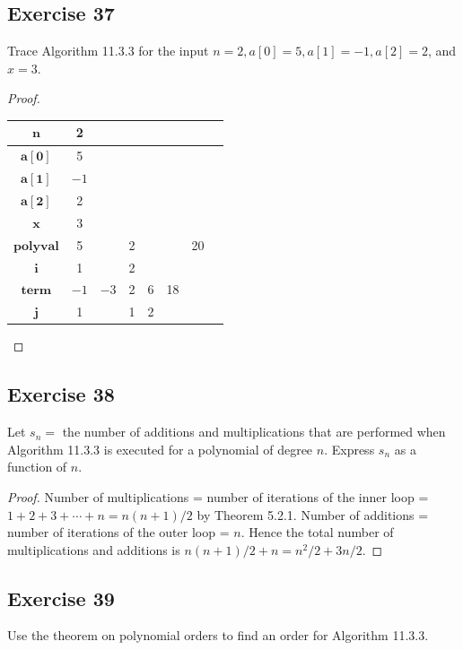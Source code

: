 \documentclass[14pt]{extarticle}
\begin{document}
\subsection{Exercise 37}
Trace Algorithm 11.3.3 for the input \(n = 2, a[0] = 5, a[1] = -1, a[2] = 2\), and \(x = 3\).

\begin{proof}
\begin{center}
\begin{tabular}{|c|c|c|c|c|c|c|c|}
\hline
\(\bm{n}\)       &2&    & & &  &  \\
\hline
\(\bm{a[0]}\)    &5&    & & &  &  \\
\hline
\(\bm{a[1]}\) &$-1$&    & & &  &  \\
\hline
\(\bm{a[2]}\)    &2&    & & &  &  \\
\hline
\(\bm{x}\)       &3&    & & &  &  \\
\hline
\(\bm{polyval}\) &5&    &2& &  &20\\
\hline
\(\bm{i}\)       &1&    &2& &  &  \\
\hline
\(\bm{term}\) &$-1$&$-3$&2&6&18&  \\
\hline
\(\bm{j}\)       &1&    &1&2&  &  \\
\hline
\end{tabular}
\end{center}
\end{proof}

\subsection{Exercise 38}
Let \(s_n =\) the number of additions and multiplications that are performed when Algorithm 11.3.3 is executed for a 
polynomial of degree \(n\). Express \(s_n\) as a function of \(n\).

\begin{proof}
Number of multiplications = number of iterations of the inner loop = \(1 +2+ 3 + \cdots + n = n(n + 1)/2\) by Theorem 5.2.1.
Number of additions = number of iterations of the outer loop = \(n\). Hence the total number of multiplications and additions 
is \(n(n + 1)/2 + n = n^2/2 + 3n/2\).
\end{proof}

\subsection{Exercise 39}
Use the theorem on polynomial orders to find an order for Algorithm 11.3.3.
\end{document}
